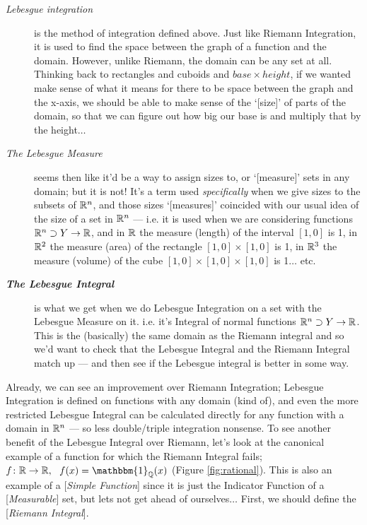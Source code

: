 \begin{description}
\item[\em Lebesgue integration\/] is the method of integration defined above. Just like Riemann Integration, it is used to find the space between the graph of a function and the domain. However, unlike Riemann, the domain can be any set at all. Thinking back to rectangles and cuboids and $base \times height$, if we wanted make sense of what it means for there to be space between the graph and the x-axis, we should be able to make sense of the `[size]' of parts of the domain, so that we can figure out how big our base is and multiply that by the height$\ldots$
%
\item[\em The Lebesgue Measure\/] seems then like it'd be a way to assign sizes to, or `[measure]' sets in any domain; but it is not! It's a term used \emph{specifically} when we give sizes to the subsets of $\mathbb{R}^n$, and those sizes `[measures]' coincided with our usual idea of the size of a set in $\mathbb{R}^n$ --- i.e. it is used when we are considering functions $\mathbb{R}^n \supset Y \rightarrow \mathbb{R}$, and in $\mathbb{R}$ the measure (length) of the interval $[1, 0]$ is 1, in $\mathbb{R}^2$ the measure (area) of the rectangle $[1, 0] \times [1, 0]$ is 1, in $\mathbb{R}^3$ the measure (volume) of the cube $[1, 0] \times [1, 0] \times [1, 0]$ is 1$\ldots$ etc. 
%
\item[\bf \em The Lebesgue Integral\/] is what we get when we do Lebesgue Integration on a set with the Lebesgue Measure on it. i.e. it's Integral of normal functions $\mathbb{R}^n \supset Y \rightarrow \mathbb{R}$. This is the (basically) the same domain as the Riemann integral and so we'd want to check that the Lebesgue Integral and the Riemann Integral match up --- and then see if the Lebesgue integral is better in some way.
\end{description}

Already, we can see an improvement over Riemann Integration; Lebesgue Integration is defined on functions with any domain (kind of), and even the more restricted Lebesgue Integral can be calculated directly for any function with a domain in $\mathbb{R}^n$ --- so less double/triple integration nonsense. To see another benefit of the Lebesgue Integral over Riemann, let's look at the canonical example of a function for which the Riemann Integral fails; $f\colon \R \rightarrow \R,\ \ f(x) = \mathbbm{1}_\Q(x)$ (Figure \ref{fig:rational}). This is also an example of a [\emph{Simple Function}] since it is just the Indicator Function of a [\emph{Measurable}] set, but lets not get ahead of ourselves$\ldots$ First, we should define the [\emph{Riemann Integral}]. 


